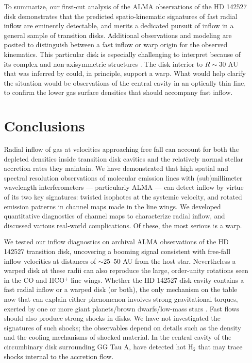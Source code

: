 To summarize, our first-cut analysis of the \citet{casassus13} ALMA 
observations of the HD 142527 disk demonstrates that the predicted 
spatio-kinematic signatures of fast radial inflow are eminently detectable, and 
merits a dedicated pursuit of inflow in a general sample of transition disks.  
Additional observations and modeling are posited to distinguish between a fast 
inflow or warp origin for the observed kinematics.  This particular disk is 
especially challenging to interpret because of its complex and non-axisymmetric 
structures \citep[][]{fukagawa06,fujiwara06,verhoeff11,casassus12,honda12,
rameau12,casassus13,canovas13}.  The disk interior to $R\sim 30$ AU that was 
inferred by \citet{verhoeff11} could, in principle, support a warp.  What would 
help clarify the situation would be observations of the central cavity in 
an optically thin line, to confirm the lower gas surface densities that should 
accompany fast inflow.

\section{Conclusions}\label{sec:conclude}

Radial inflow of gas at velocities approaching free fall can account for both 
the depleted densities inside transition disk cavities and the relatively 
normal stellar accretion rates they maintain.  We have demonstrated that high 
spatial and spectral resolution observations of molecular emission lines with
(sub)millimeter wavelength interferometers --- particularly ALMA --- can detect 
inflow by virtue of its two key signatures: twisted isophotes at the systemic 
velocity, and rotated emission patterns in channel maps made in the line wings.
We developed quantitative diagnostics of channel maps to characterize radial 
inflow, and discussed various real-world complications.  Of these, the most 
serious is a warp.  

We tested our inflow diagnostics on archival ALMA observations of the HD 142527
transition disk, uncovering a booming signal consistent with free-fall inflow 
velocities at distances of $\sim$25--50 AU from the host star.  Nevertheless a 
warped disk at these radii can also reproduce the large, order-unity rotations 
seen in the CO and HCO$^+$ line wings.  Whether the HD 142527 disk cavity 
contains a fast radial inflow or a warped disk (or both), the only mechanism on 
the table now that can explain either phenomenon involves strong gravitational
torques, exerted by one or more giant planets/brown dwarfs/low-mass stars 
\citep[as yet undetected; see][]{biller12,casassus13}.  Fast flows should also 
produce strong shocks in disks.  We have not investigated the signatures of 
such shocks; the observables depend on details such as the density
and the cooling mechanisms of shocked material.
In the central cavity of the circumbinary disk surrounding GG Tau A,
\cite{beck12} have detected hot H$_2$
that may trace shocks internal to the accretion flow.

